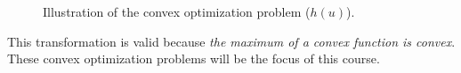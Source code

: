 \begin{figure}[hbpt!]
    \centering
    \caption{Illustration of the convex optimization problem ($h(u)$).}
\end{figure}

This transformation is valid because \textit{the maximum of a convex function is convex}. These convex optimization problems will be the focus of this course.

